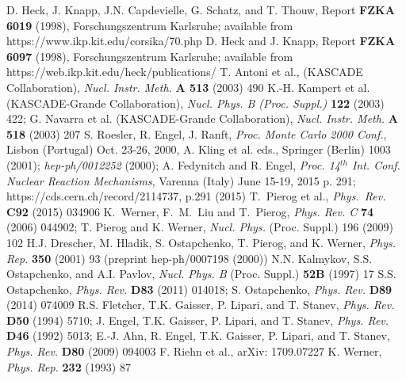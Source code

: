  D. Heck, J. Knapp, J.N. Capdevielle, G. Schatz, and
              T. Thouw, Report {\bf FZKA 6019} (1998), Forschungszentrum 
              Karls\-ruhe; available from\\
              https://www.ikp.kit.edu/corsika/70.php
 D. Heck and J. Knapp, Report {\bf FZKA 6097} (1998), 
              Forschungszentrum Karls\-ruhe; available from
              https://web.ikp.kit.edu/heck/publications/
 T. Antoni et al., (KASCADE Collaboration),
              {\it Nucl. Instr. Meth.} {\bf A 513} (2003) 490
 K.-H. Kampert et al. (KASCADE-Grande Collaboration), 
              {\it Nucl.  Phys. B (Proc. Suppl.)} {\bf 122} (2003) 422;
              G. Navarra et al. (KASCADE-Grande Collaboration),
              {\it Nucl. Instr. Meth.} {\bf A 518} (2003) 207
 S. Roesler, R. Engel, J. Ranft, {\it Proc. Monte Carlo
              2000 Conf.}, Lisbon (Portugal) Oct. 23-26, 2000,
              A. Kling et al. eds., Springer (Berlin) 1003 (2001);
              {\it hep-ph/0012252} (2000);
              A. Fedynitch and R. Engel, {\it Proc. 14$^{th}$  Int. Conf.
              Nuclear Reaction Mechanisms}, Varenna (Italy) June 15-19, 2015
              p. 291; https://cds.cern.ch/record/2114737, p.291 (2015)
 T.~Pierog et al., {\it Phys.\ Rev.} {\bf C92} (2015) 034906
 K.~Werner, F.~M.~Liu and T.~Pierog,
               {\it Phys. Rev. C} {\bf 74} (2006) 044902;
                T. Pierog and K. Werner, {\it Nucl. Phys.} (Proc. Suppl.) 
               196 (2009) 102
 H.J. Drescher, M. Hladik, S. Ostapchenko, T. Pierog, and
              K. Werner, {\it Phys. Rep.} {\bf 350} (2001) 93 
              (preprint hep-ph/0007198 (2000))
 N.N. Kalmykov, S.S. Ostapchenko, and A.I. Pavlov, {\it Nucl. 
              Phys. B} (Proc. Suppl.) {\bf 52B} (1997) 17
 S.S. Ostapchenko, {\it Phys. Rev.} {\bf D83} (2011) 014018;
              S. Ostapchenko, {\it Phys. Rev.} {\bf D89} (2014) 074009
R.S. Fletcher, T.K. Gaisser, P. Lipari, and T. Stanev,
              {\it Phys. Rev.} {\bf D50} (1994) 5710;
              J. Engel, T.K. Gaisser, P. Lipari, and T. Stanev,
              {\it Phys. Rev.} {\bf D46} (1992) 5013;
              E.-J. Ahn, R. Engel, T.K. Gaisser, P. Lipari, and T. Stanev, 
              {\it Phys. Rev.} {\bf D80} (2009) 094003
 F. Riehn et al., arXiv: 1709.07227
 K. Werner, {\it Phys. Rep.} {\bf 232} (1993) 87
